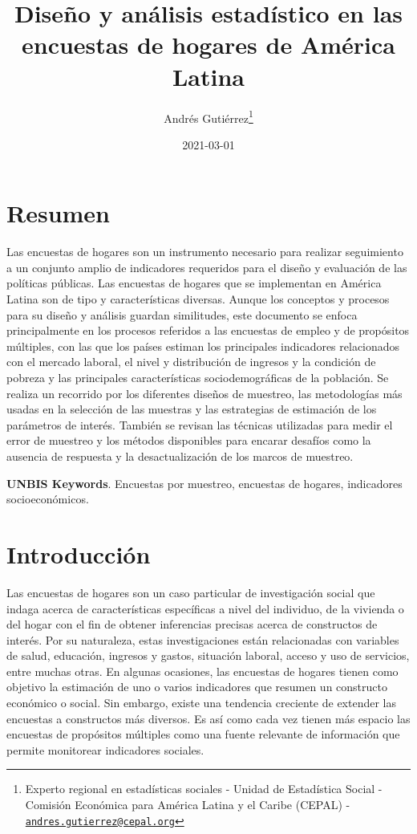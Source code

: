 \documentclass[
  12pt,
  spanish,
]{book}
\title{Diseño y análisis estadístico en las encuestas de hogares de América Latina}
\author{Andrés Gutiérrez\footnote{Experto regional en estadísticas sociales - Unidad de Estadística Social - Comisión Económica para América Latina y el Caribe (CEPAL) - \href{mailto:andres.gutierrez@cepal.org}{\nolinkurl{andres.gutierrez@cepal.org}}}}
\date{2021-03-01}
\begin{document}
\maketitle

{
\hypersetup{linkcolor=}
\setcounter{tocdepth}{1}
\tableofcontents
}
\listoftables
\listoffigures
\hypertarget{resumen}{%
\chapter*{Resumen}\label{resumen}}

Las encuestas de hogares son un instrumento necesario para realizar seguimiento a un conjunto amplio de indicadores requeridos para el diseño y evaluación de las políticas públicas. Las encuestas de hogares que se implementan en América Latina son de tipo y características diversas. Aunque los conceptos y procesos para su diseño y análisis guardan similitudes, este documento se enfoca principalmente en los procesos referidos a las encuestas de empleo y de propósitos múltiples, con las que los países estiman los principales indicadores relacionados con el mercado laboral, el nivel y distribución de ingresos y la condición de pobreza y las principales características sociodemográficas de la población. Se realiza un recorrido por los diferentes diseños de muestreo, las metodologías más usadas en la selección de las muestras y las estrategias de estimación de los parámetros de interés. También se revisan las técnicas utilizadas para medir el error de muestreo y los métodos disponibles para encarar desafíos como la ausencia de respuesta y la desactualización de los marcos de muestreo.

\textbf{UNBIS Keywords}. Encuestas por muestreo, encuestas de hogares, indicadores socioeconómicos.

\hypertarget{introducciuxf3n}{%
\chapter{Introducción}\label{introducciuxf3n}}

Las encuestas de hogares son un caso particular de investigación social que indaga acerca de características específicas a nivel del individuo, de la vivienda o del hogar con el fin de obtener inferencias precisas acerca de constructos de interés. Por su naturaleza, estas investigaciones están relacionadas con variables de salud, educación, ingresos y gastos, situación laboral, acceso y uso de servicios, entre muchas otras. En algunas ocasiones, las encuestas de hogares tienen como objetivo la estimación de uno o varios indicadores que resumen un constructo económico o social. Sin embargo, existe una tendencia creciente de extender las encuestas a constructos más diversos. Es así como cada vez tienen más espacio las encuestas de propósitos múltiples como una fuente relevante de información que permite monitorear indicadores sociales.
\end{document}
